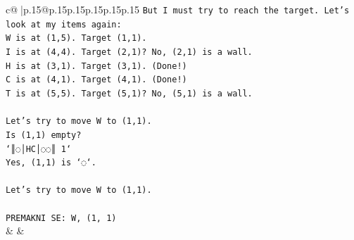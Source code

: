 \documentclass{article}
\begin{document}
{\begin{supertabular}{c@{$\;$}|p{.15\linewidth}@{}p{.15\linewidth}p{.15\linewidth}p{.15\linewidth}p{.15\linewidth}p{.15\linewidth}}
{{{\texttt{But I must try to reach the target. Let's look at my items again:} \\
\texttt{W is at (1,5). Target (1,1).} \\
\texttt{I is at (4,4). Target (2,1)? No, (2,1) is a wall.} \\
\texttt{H is at (3,1). Target (3,1). (Done!)} \\
\texttt{C is at (4,1). Target (4,1). (Done!)} \\
\texttt{T is at (5,5). Target (5,1)? No, (5,1) is a wall.} \\
\\ 
\texttt{Let's try to move W to (1,1).} \\
\texttt{Is (1,1) empty?} \\
\texttt{`║◌│HC│◌◌║ 1`} \\
\texttt{Yes, (1,1) is `◌`.} \\
\\ 
\texttt{Let's try to move W to (1,1).} \\
\\ 
\texttt{PREMAKNI SE: W, (1, 1)} \\
            }
        }
    }
    & & \\ \\


\end{supertabular}}
\end{document}
